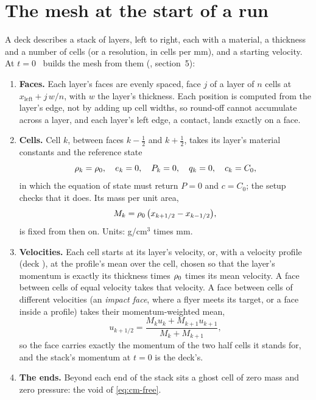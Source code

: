 \section{The mesh at the start of a run}
\label{sec:mesh}

A deck describes a stack of layers, left to right, each with a material,
a thickness and a number of cells (or a resolution, in cells per mm), and
a starting velocity. At $t = 0$ \bw\ builds the mesh from them
(, section~5):

\begin{enumerate}
\item \textbf{Faces.} Each layer's faces are evenly spaced, face $j$ of a
  layer of $n$ cells at $x_{\mathrm{left}} + j\,w/n$, with $w$ the layer's
  thickness. Each position is computed from the layer's edge, not by
  adding up cell widths, so round-off cannot accumulate across a layer, and
  each layer's left edge, a contact, lands exactly on a face.
\item \textbf{Cells.} Cell $k$, between faces $k - \tfrac{1}{2}$ and
  $k + \tfrac{1}{2}$, takes its layer's material constants and the
  reference state
  \begin{equation}
  \rho_k = \rho_0, \quad e_k = 0, \quad P_k = 0, \quad q_k = 0,
  \quad c_k = C_0,
  \label{eq:cm-start}
  \end{equation}
  in which the equation of state must return $P = 0$ and $c = C_0$; the
  setup checks that it does. Its mass per unit area,
  \begin{equation}
  M_k = \rho_0\,\bigl(x_{k+1/2} - x_{k-1/2}\bigr),
  \label{eq:cm-mass-cell}
  \end{equation}
  is fixed from then on. Units: g/cm$^3$ times mm.
\item \textbf{Velocities.} Each cell starts at its layer's velocity, or,
  with a velocity profile (deck ), at the profile's mean
  over the cell, chosen so that the layer's momentum is exactly its
  thickness times $\rho_0$ times its mean velocity. A face between cells
  of equal velocity takes that velocity. A face between cells of different
  velocities (an \emph{impact face}, where a flyer meets its target, or a
  face inside a profile) takes their momentum-weighted mean,
  \begin{equation}
  u_{k+1/2} = \frac{M_k u_k + M_{k+1} u_{k+1}}{M_k + M_{k+1}},
  \label{eq:cm-impact}
  \end{equation}
  so the face carries exactly the momentum of the two half cells it
  stands for, and the stack's momentum at $t = 0$ is the deck's.
\item \textbf{The ends.} Beyond each end of the stack sits a ghost cell
  of zero mass and zero pressure: the void of \cref{eq:cm-free}.
\end{enumerate}


